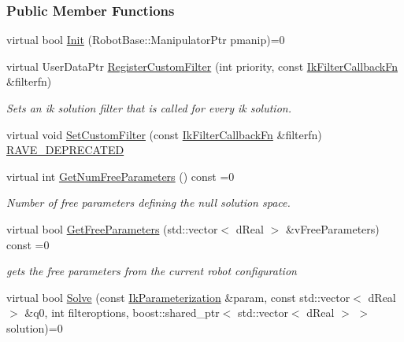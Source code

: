 \subsubsection*{Public Member Functions}
\begin{DoxyCompactItemize}
\item 
virtual bool \hyperlink{classOpenRAVE_1_1IkSolverBase_afdba95c2515eb1d2a7d375c24f8dcb41}{Init} (RobotBase::ManipulatorPtr pmanip)=0
\item 
virtual UserDataPtr \hyperlink{classOpenRAVE_1_1IkSolverBase_a9ac28a8ef0d2511ea4a7e89e81ad013d}{RegisterCustomFilter} (int priority, const \hyperlink{classOpenRAVE_1_1IkSolverBase_a2f7085e3e716d58bbbc95fa53926313e}{IkFilterCallbackFn} \&filterfn)
\begin{DoxyCompactList}\small\item\em Sets an ik solution filter that is called for every ik solution. \item\end{DoxyCompactList}\item 
virtual void \hyperlink{classOpenRAVE_1_1IkSolverBase_adda44b94bfdbdee2cc57341d6fdef299}{SetCustomFilter} (const \hyperlink{classOpenRAVE_1_1IkSolverBase_a2f7085e3e716d58bbbc95fa53926313e}{IkFilterCallbackFn} \&filterfn) \hyperlink{namespaceOpenRAVE_af23fc4c2c72950a8c02f38ef71680bc6}{RAVE\_\-DEPRECATED}
\item 
virtual int \hyperlink{classOpenRAVE_1_1IkSolverBase_a1d5067536e60e18e86fb94429e4d289f}{GetNumFreeParameters} () const =0
\begin{DoxyCompactList}\small\item\em Number of free parameters defining the null solution space. \item\end{DoxyCompactList}\item 
virtual bool \hyperlink{classOpenRAVE_1_1IkSolverBase_a37c664c2f07d523edfa463d06a1654c6}{GetFreeParameters} (std::vector$<$ dReal $>$ \&vFreeParameters) const =0
\begin{DoxyCompactList}\small\item\em gets the free parameters from the current robot configuration \item\end{DoxyCompactList}\item 
virtual bool \hyperlink{classOpenRAVE_1_1IkSolverBase_a283c44d6bd1ab0023aa8079f2f22db0a}{Solve} (const \hyperlink{classOpenRAVE_1_1IkParameterization}{IkParameterization} \&param, const std::vector$<$ dReal $>$ \&q0, int filteroptions, boost::shared\_\-ptr$<$ std::vector$<$ dReal $>$ $>$ solution)=0

\end{DoxyCompactItemize}
